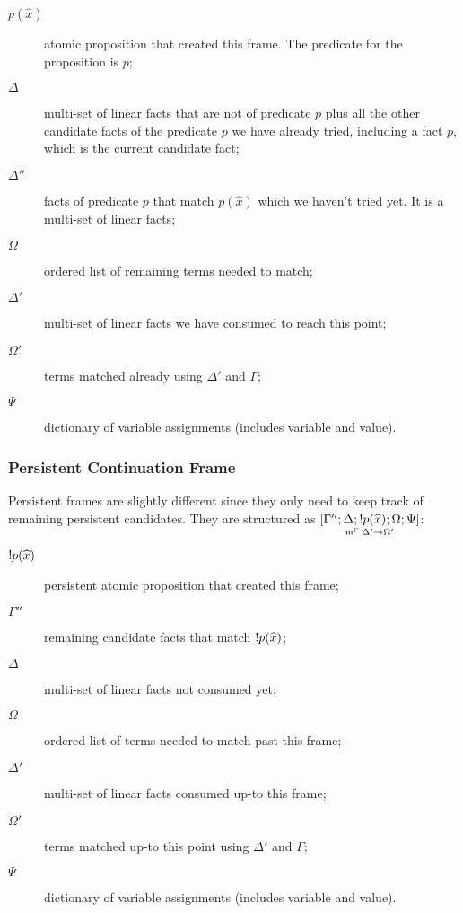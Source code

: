 \begin{description}

   \item[$p(\widehat{x})$] atomic proposition that created this
      frame. The predicate for the proposition is $p$;

   \item[$\Delta$] multi-set of linear facts that are not of predicate $p$ plus
      all the other candidate facts of the predicate $p$ we have already
      tried, including a fact $p$, which is the current candidate fact;

   \item[$\Delta''$] facts of predicate $p$ that match $p(\widehat{x})$ which we
      haven't tried yet. It is a multi-set of linear facts;


   \item[$\Omega$] ordered list of remaining terms needed to match;

   \item[$\Delta'$] multi-set of linear facts we have consumed to reach this point;

   \item[$\Omega'$] terms matched already using $\Delta'$ and $\Gamma$;
   \item[$\Psi$] dictionary of variable assignments (includes variable and
      value).
\end{description}

\subsubsection{Persistent Continuation Frame}

Persistent frames are slightly different since they only need to keep track of
remaining persistent candidates. They are structured as
$\pframe{\Gamma''}{\Delta}{\bang
   p(\widehat{x})}{\Omega; \Psi}{\Delta'}{\Omega'}$:

\begin{description}
   \item[$\bang p(\widehat{x})$] persistent atomic proposition that created
      this frame;
   \item[$\Gamma''$] remaining candidate facts that match $\bang p(\widehat{x})$;
   \item[$\Delta$] multi-set of linear facts not consumed yet;

   \item[$\Omega$] ordered list of terms needed to match past this
   frame;

   \item[$\Delta'$] multi-set of linear facts consumed up-to this frame;
   \item[$\Omega'$] terms matched up-to this point using $\Delta'$ and $\Gamma$;
   \item[$\Psi$] dictionary of variable assignments (includes variable and value).
\end{description}


